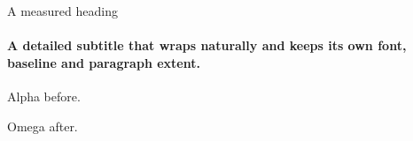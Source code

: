 \documentclass[14pt,aspectratio=43]{beamer}
\date{}
\begin{document}
\begin{frame}[plain,t]{A measured heading}
\framesubtitle{A detailed subtitle that wraps naturally and keeps its own font, baseline and paragraph extent.}
Alpha before.

Omega after.
\end{frame}
\end{document}

